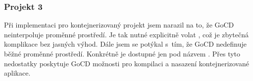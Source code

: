         \subsubsection{Projekt 3}
            Při implementaci \CI pro kontejnerizovaný projekt jsem narazil na to, že GoCD neinterpoluje proměnné prostředí. Je tak nutné explicitně volat , což je zbytečná komplikace bez jasných výhod. Dále jsem se potýkal s~tím, že GoCD nedefinuje běžné proměnné prostředí. Konkrétně  je dostupné jen pod názvem . Přes tyto nedostatky poskytuje GoCD možnosti pro kompilaci a nasazení kontejnerizované aplikace.

